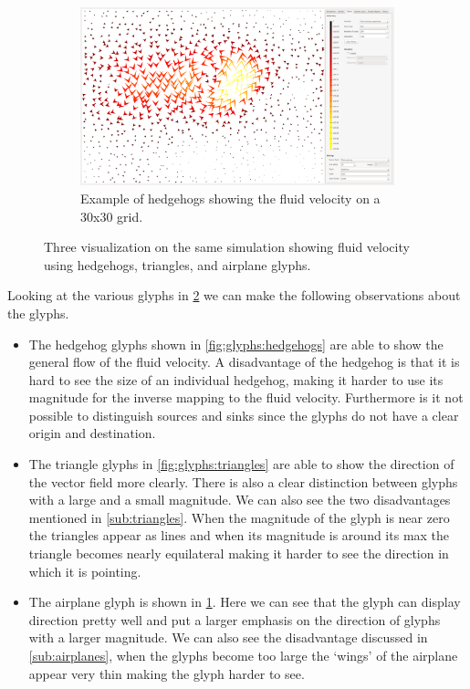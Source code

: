\begin{figure}[tb]
\begin{subfigure}{0.6\textwidth}
		\centering
		\includegraphics[width=\textwidth, trim={35px 30px 430px 30px},clip]{img/glyphs/airplanes.png}
		\caption{Example of hedgehogs showing the fluid velocity on a 30x30 grid.}
		\label{fig:glyphs:airplanes}
	\end{subfigure}
	\caption{Three visualization on the same simulation showing fluid velocity using hedgehogs, triangles, and airplane glyphs.}
	\label{fig:glyphs}
\end{figure}

Looking at the various glyphs in \cref{fig:glyphs} we can make the following observations about the glyphs.
\begin{itemize}
	\item The hedgehog glyphs shown in \cref{fig:glyphs:hedgehogs} are able to show the general flow of the fluid velocity. A disadvantage of the hedgehog is that it is hard to see the size of an individual hedgehog, making it harder to use its magnitude for the inverse mapping to the fluid velocity. Furthermore is it not possible to distinguish sources and sinks since the glyphs do not have a clear origin and destination.
	\item The triangle glyphs in \cref{fig:glyphs:triangles} are able to show the direction of the vector field more clearly. There is also a clear distinction between glyphs with a large and a small magnitude. We can also see the two disadvantages mentioned in \cref{sub:triangles}. When the magnitude of the glyph is near zero the triangles appear as lines and when its magnitude is around its max the triangle becomes nearly equilateral making it harder to see the direction in which it is pointing.
	\item The airplane glyph is shown in \cref{fig:glyphs:airplanes}. Here we can see that the glyph can display direction pretty well and put a larger emphasis on the direction of glyphs with a larger magnitude. We can also see the disadvantage discussed in \cref{sub:airplanes}, when the glyphs become too large the `wings' of the airplane appear very thin making the glyph harder to see.
\end{itemize}

